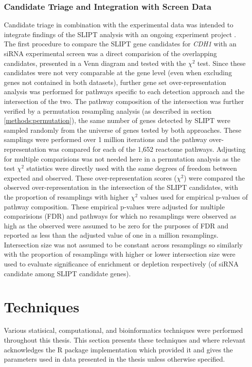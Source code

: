 \subsubsection{Candidate Triage and Integration with Screen Data} \label{methods:venn_analysis}
Candidate triage in combination with the experimental data was intended to integrate findings of the SLIPT analysis with an ongoing experiment project \citep{Chen2014, Telford2015}. The first procedure to compare the SLIPT gene candidates for \textit{CDH1} with an siRNA experimental screen \citep{Telford2015} was a direct comparision of the overlapping candidates, presented in a Venn diagram and tested with the $\chi^2$ test. Since these candidates were not very comparable at the gene level (even when excluding genes not contained in both datasets), further gene set over-representation analysis was performed for pathways specific to each detection approach and the intersection of the two. The pathway composition of the intersection was further verified by a permutation resampling analysis (as described in section \ref{methods:permutation}), the same number of genes detected by SLIPT were sampled randomly from the universe of genes tested by both approaches. These samplings were performed over 1 million iterations and the pathway over-representation was compared for each of the 1,652 reactome pathways. Adjusting for multiple comparisions was not needed here in a permutation analysis as the test $\chi^2$ statistics were directly used with the same degrees of freedom between expected and observed. These over-representation scores ($\chi^2$) were compared the observed over-representation in the intersection of the SLIPT candidates, with the proportion of resamplings with higher $\chi^2$ values used for empirical p-values of pathway composition. These empirical p-values were adjusted for multiple comparisions (FDR) and pathways for which no resamplings were observed as high as the observed were assumed to be zero for the purposes of FDR and reported as less than the adjusted value of one in a million resamplings. Intersection size was not assumed to be constant across resamplings so similarly with the proportion of resamplings with higher or lower intersection size were used to evaluate significance of enrichment or depletion respectively (of siRNA candidate among SLIPT candidate genes).  

\section{Techniques}
Various statisical, computational, and bioinformatics techniques were performed throughout this thesis. This section presents these techniques and where relevant acknowledges the R package implementation which provided it and gives the parameters used in data presented in the thesis unless otherwise specified.

